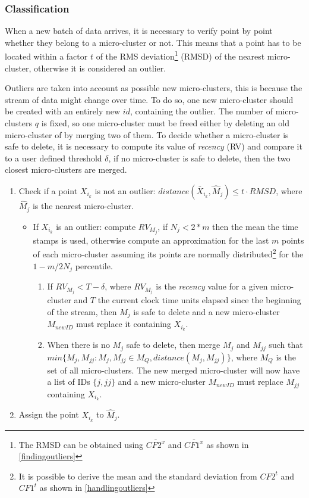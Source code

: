 \documentclass{llncs}
\begin{document}
\subsubsection{Classification}
\label{clus:classification}
When a new batch of data arrives, it is necessary to verify point by point whether they belong to a micro-cluster or not. This means that a point has to be located within a factor $t$ of the RMS deviation\footnote{The RMSD can be obtained using $\overline{CF2^x}$ and $\overline{CF1^x}$ as shown in \ref{findingoutliers}} (RMSD) of the nearest micro-cluster, otherwise it is considered an outlier.

Outliers are taken into account as possible new micro-clusters, this is because the stream of data might change over time. To do so, one new micro-cluster should be created with an entirely new $id$, containing the outlier. The number of micro-clusters $q$ is fixed, so one micro-cluster must be freed either by deleting an old micro-cluster of by merging two of them. To decide whether a micro-cluster is safe to delete, it is necessary to compute its value of \textit{recency} (RV) and compare it to a user defined threshold $\delta$, if no micro-cluster is safe to delete, then the two closest micro-clusters are merged.

\begin{enumerate}
 \item Check if a point $X_{i_k}$ is not an outlier: $distance(\bar X_{i_k}, \hat M_j) \leq t \cdot RMSD$, where $\hat M_j$ is the nearest micro-cluster.
 \begin{itemize}
  \item If $X_{i_k}$ is an outlier: compute $RV_{M_j}$, if $N_j < 2*m$ then the mean the time stamps is used, otherwise compute an approximation for the last $m$ points of each micro-cluster assuming its points are normally distributed\footnote{It is possible to derive the mean and the standard deviation from $CF2^t$ and $CF1^t$ as shown in \ref{handlingoutliers}} for the $1 - m/2N_j$ percentile.
  \begin{enumerate}
   \item If $RV_{M_j} < T - \delta$, where $RV_{M_j}$ is the \textit{recency} value for a given micro-cluster and $T$ the current clock time units elapsed since the beginning of the stream, then $M_j$ is safe to delete and a new micro-cluster $M_{newID}$ must replace it containing $X_{i_k}$.
   \item When there is no $M_j$ safe to delete, then merge $M_j$ and $M_{jj}$ such that $min\{M_j,M_{jj} : M_j,M_{jj} \in M_Q, distance(M_j,M_{jj})\}$, where $M_Q$ is the set of all micro-clusters. The new merged micro-cluster will now have a list of IDs $\{j,jj\}$ and a new micro-cluster $M_{newID}$ must replace $M_{jj}$ containing $X_{i_k}$.
  \end{enumerate}

 \end{itemize}
 \item Assign the point $X_{i_k}$ to $\hat M_j$.

\end{enumerate}
\end{document}
